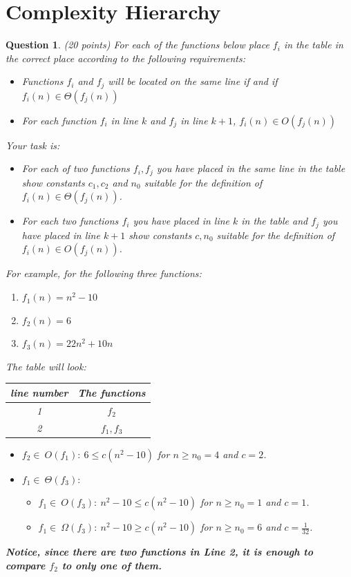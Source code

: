 \documentclass[a4paper]{article}
\theoremstyle{remarksStyle}
\theoremstyle{questionStyle}
\newtheorem{question}{Question}
\theoremstyle{answerStyle}
\begin{document}
\section{Complexity Hierarchy}
\begin{question} (20 points)
For each of the functions below place $f_{i}$ in the table in the correct place according to the following requirements:
\begin{itemize}
\item Functions $f_{i}$ and $f_{j}$ will be located on the same line if and if $f_{i}(n) \in \Theta(f_{j}(n))$  
\item For each function $f_{i}$ in line $k$ and $f_{j}$ in line $k+1$, $f_{i}(n) \in O(f_{j}(n))$
\end{itemize}
Your task is:
\begin{itemize}
    \item For each of two functions $f_{i}, f_{j}$ you have placed in the same line in the table show constants $c_1, c_2$ and $n_0$ suitable for the definition of $f_{i}(n) \in \Theta(f_{j}(n))$.
    \item For each two functions $f_{i}$ you have placed in line $k$ in the table and $f_{j}$ you have  placed in line $k+1$ show constants $c, n_0$ suitable for the definition of $f_{i}(n) \in O(f_{j}(n))$.
\end{itemize}

\begin{boxxed}
For example, for the following three functions:
\begin{enumerate}
    \item $f_{1}(n) = n^2 -10$
      \item $f_{2}(n) = 6$
    \item $f_{3}(n) = 22 n^2 + 10n$
\end{enumerate}
The table will look:
\begin{center}
\begin{tabular}{||c | c ||} 
 \hline
 line number & The functions \\ [0.5ex] 
 \hline\hline
 1 &  $f_{2}$ \\ 
 \hline
 2 &  $f_{1},f_{3}$\\ 
  \hline
\end{tabular}
\end{center}
\begin{itemize}
    \item $f_{2} \in \ O(f_{1}): \ 6 \leq c(n^2 -10)$ for $n \ge n_0 =4$ and $c=2$.
   \item  $f_{1} \in \ \Theta(f_{3}):$
      \begin{itemize}
          \item   $f_{1} \in \ O(f_{3}): \ n^2 -10 \leq c(n^2 -10)$ for $n \ge n_0 =1$ and $c=1$.
         \item $f_{1} \in \ \Omega(f_{3}): \ n^2 -10 \geq c(n^2 -10)$ for $n \ge n_0 =6$ and $c=\frac{1}{32}$.
     \end{itemize} 
\end{itemize} 
\textbf{Notice, since there are two functions in Line 2, it is enough to compare $f_{2}$ to only one of them.}
\end{boxxed}


\end{question}
\end{document}
